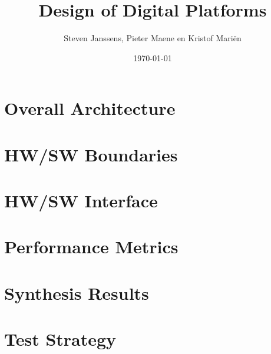 \documentclass[a4paper]{article}
\title{Design of Digital Platforms}
\author{Steven Janssens, Pieter Maene en Kristof Mari\"en}
\date{\today}
\begin{document}
\maketitle

\section{Overall Architecture}

\section{HW/SW Boundaries}

\section{HW/SW Interface}

\section{Performance Metrics}

\section{Synthesis Results}

\section{Test Strategy}
\end{document}
